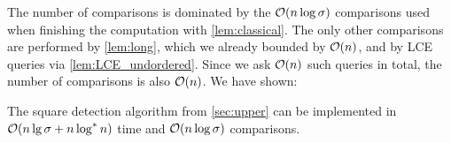 The number of comparisons is dominated by the $\mathcal{O}(n \log \sigma)$ comparisons used when finishing the computation with \cref{lem:classical}. The only other comparisons are performed by \cref{lem:long}, which we already bounded by $\mathcal{O}(n)$, and by LCE queries via \cref{lem:LCE_undordered}. Since we ask $\mathcal{O}(n)$ such queries in total, the number of comparisons is also $\mathcal{O}(n)$.
We have shown:

\begin{lemma}
The square detection algorithm from \cref{sec:upper} can be implemented in $\mathcal{O}(n \lg \sigma + n \log^* n)$ time and $\mathcal{O}(n \log \sigma)$ comparisons.
\end{lemma}
